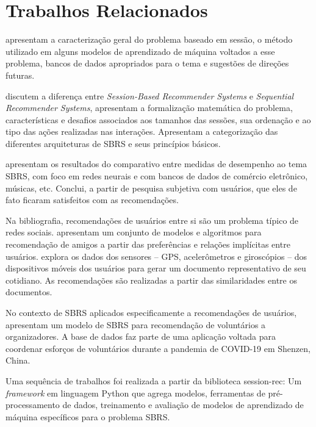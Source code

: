 \section{Trabalhos Relacionados}

\citet{rec_sys_handbook_2022} apresentam a caracterização geral do problema
baseado em sessão, o método utilizado em alguns modelos de aprendizado de
máquina voltados a esse problema, bancos de dados apropriados para o tema e
sugestões de direções futuras. \cite{rec_sys_handbook_2022, JLZ18,LATIFI_2021, quadrana2018sequence}

\citet{survey_wang_2021} discutem a diferença entre \textit{Session-Based Recommender Systems}
e \textit{Sequential Recommender Systems}, apresentam a formalização matemática
do problema, características e desafios associados aos tamanhos das sessões, sua
ordenação e ao tipo das ações realizadas nas interações. Apresentam a
categorização das diferentes arquiteturas de SBRS e seus princípios básicos.

\citet{ludewig2021empirical}
apresentam os resultados do comparativo entre medidas de desempenho ao tema
SBRS, com foco em redes neurais e com bancos de dados de comércio eletrônico,
músicas, etc. Conclui, a partir de pesquisa subjetiva com usuários, que eles de
fato ficaram satisfeitos com as recomendações.
\cite{ludewig2021empirical, ludewig_2018,ludewig_2019,ludewig2020advances}

Na bibliografia, recomendações de usuários entre si são um problema típico de
redes sociais. \citet{cui2018dual} apresentam um conjunto de modelos e
algoritmos para recomendação de amigos a partir das preferências e relações
implícitas entre usuários. \citet{wang2014friendbook} explora os dados dos
sensores -- GPS, acelerômetros e giroscópios -- dos dispositivos móveis dos
usuários para gerar um documento representativo de seu cotidiano. As
recomendações são realizadas a partir das similaridades entre os documentos.

No contexto de SBRS aplicados especificamente a recomendações de usuários,
\citet{muvunza2023session} apresentam um modelo de SBRS para recomendação de
voluntários a organizadores. A base de dados faz parte de uma aplicação voltada
para coordenar esforços de voluntários durante a pandemia de COVID-19 em
Shenzen, China.

Uma sequência de trabalhos
\cite{LATIFI_2021,ludewig2021empirical,ludewig_2018,ludewig_2019,sessionrec, jusbrasil2022} foi
realizada a partir da biblioteca session-rec: Um \textit{framework} em linguagem
Python que agrega modelos, ferramentas de pré-processamento de dados,
treinamento e avaliação de modelos de aprendizado de máquina específicos para o
problema SBRS.

